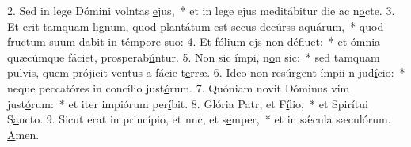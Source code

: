 2. Sed in lege Dómini volntas \uline{e}jus,~* et in lege ejus meditábitur die ac n\uline{o}cte.
3. Et erit tamquam lignum, quod plantátum est secus decúrss a\uline{quá}rum,~* quod fructum suum dabit in témpore s\uline{u}o:
4. Et fólium ejs non d\uline{é}fluet:~* et ómnia quæcúmque fáciet, prosperab\uline{ú}ntur.
5. Non sic ímpi, n\uline{o}n sic:~* sed tamquam pulvis, quem prójicit ventus a fácie t\uline{e}rræ.
6. Ideo non resúrgent ímpii n jud\uline{í}cio:~* neque peccatóres in concílio just\uline{ó}rum.
7. Quóniam novit Dóminus vim just\uline{ó}rum:~* et iter impiórum per\uline{í}bit.
8. Glória Patr, et F\uline{í}lio,~* et Spirítui S\uline{a}ncto.
9. Sicut erat in princípio, et nnc, et s\uline{e}mper,~* et in sǽcula sæculórum. \uline{A}men.
